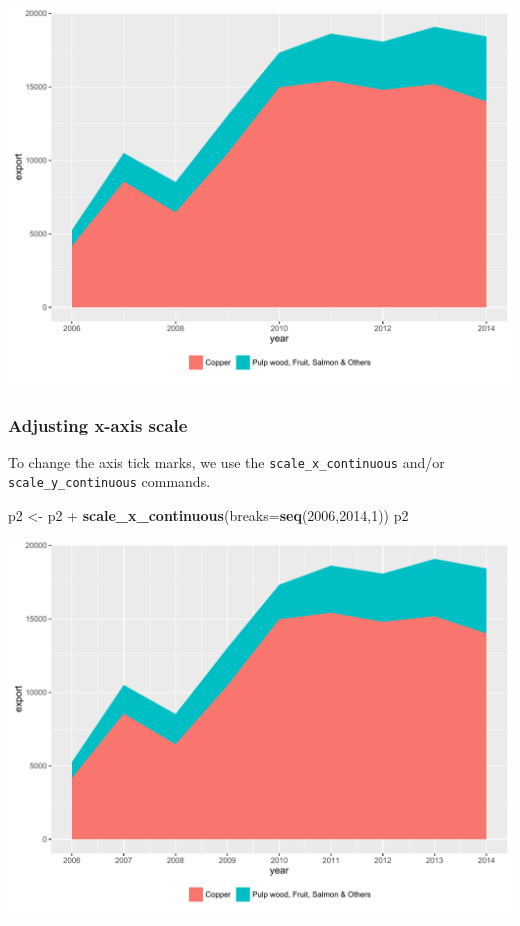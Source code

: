 \documentclass[]{article}
\newenvironment{Shaded}{\begin{snugshade}}{\end{snugshade}}
\newcommand{\KeywordTok}[1]{\textcolor[rgb]{0.13,0.29,0.53}{\textbf{{#1}}}}
\newcommand{\DataTypeTok}[1]{\textcolor[rgb]{0.13,0.29,0.53}{{#1}}}
\newcommand{\DecValTok}[1]{\textcolor[rgb]{0.00,0.00,0.81}{{#1}}}
\newcommand{\StringTok}[1]{\textcolor[rgb]{0.31,0.60,0.02}{{#1}}}
\newcommand{\NormalTok}[1]{{#1}}
\begin{document}
\begin{center}\includegraphics{0_all_posts_pdf/area_3-1} \end{center}

\subsubsection{Adjusting x-axis scale}\label{adjusting-x-axis-scale-1}

To change the axis tick marks, we use the \texttt{scale\_x\_continuous}
and/or \texttt{scale\_y\_continuous} commands.

\begin{Shaded}
\begin{Highlighting}[]
\NormalTok{p2 <-}\StringTok{ }\NormalTok{p2 +}\StringTok{ }\KeywordTok{scale_x_continuous}\NormalTok{(}\DataTypeTok{breaks=}\KeywordTok{seq}\NormalTok{(}\DecValTok{2006}\NormalTok{,}\DecValTok{2014}\NormalTok{,}\DecValTok{1}\NormalTok{))}
\NormalTok{p2}
\end{Highlighting}
\end{Shaded}

\begin{center}\includegraphics{0_all_posts_pdf/area_4-1} \end{center}
\end{document}
